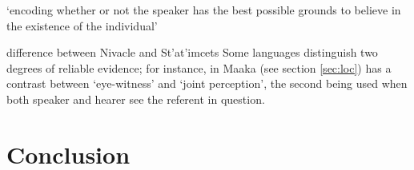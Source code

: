 \documentclass[oneside,a4paper,11pt]{article}
\newcommand{\ipa}[1]{{\phon \mbox{#1}}} %
\begin{document}
\citet{gutierrez11evidentiality}
\citet{matthewson07epistemic}
\citet{gutierrez12determiners}

 \citet{gutierrez11evidentiality} `encoding whether or not the speaker has the best possible grounds to believe in the existence of the individual' 
 
 difference between Nivacle and St'at'imcets
 Some languages distinguish two degrees of reliable evidence; for instance, in Maaka (see section \ref{sec:loc}) has a contrast between `eye-witness' and `joint perception', the second being used when both speaker and hearer see the referent in question. 
 
 
 
 




 

\section{Conclusion}




\end{document}
